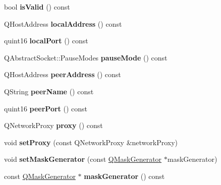\begin{DoxyCompactItemize}
bool {\bfseries is\+Valid} () const
\item 
\mbox{\label{class_q_web_socket_private_a81daf9f5f47d189e7106f7bd7df83405}} 
Q\+Host\+Address {\bfseries local\+Address} () const
\item 
\mbox{\label{class_q_web_socket_private_a9633bea87df6bb4908cb58a59bde0d8e}} 
quint16 {\bfseries local\+Port} () const
\item 
\mbox{\label{class_q_web_socket_private_aecddcb3dc07adda2f1967b769a670bac}} 
Q\+Abstract\+Socket\+::\+Pause\+Modes {\bfseries pause\+Mode} () const
\item 
\mbox{\label{class_q_web_socket_private_a9b6328d3cce77882a6bb64491b8585f1}} 
Q\+Host\+Address {\bfseries peer\+Address} () const
\item 
\mbox{\label{class_q_web_socket_private_a922403ed4819d606e890e794ad8cdc83}} 
Q\+String {\bfseries peer\+Name} () const
\item 
\mbox{\label{class_q_web_socket_private_afb3105d2a5bdb72f979471163a9bdb8f}} 
quint16 {\bfseries peer\+Port} () const
\item 
\mbox{\label{class_q_web_socket_private_a5a90aa93935d8d742536c437d6253677}} 
Q\+Network\+Proxy {\bfseries proxy} () const
\item 
\mbox{\label{class_q_web_socket_private_ac52ac72af846ed486839024c2600472f}} 
void {\bfseries set\+Proxy} (const Q\+Network\+Proxy \&network\+Proxy)
\item 
\mbox{\label{class_q_web_socket_private_a49a5b30b4f006cf111bff4e444d290f0}} 
void {\bfseries set\+Mask\+Generator} (const \mbox{\hyperlink{class_q_mask_generator}{Q\+Mask\+Generator}} $\ast$mask\+Generator)
\item 
\mbox{\label{class_q_web_socket_private_a1b585292c9f309e009fe4a1f34599bab}} 
const \mbox{\hyperlink{class_q_mask_generator}{Q\+Mask\+Generator}} $\ast$ {\bfseries mask\+Generator} () const

\end{DoxyCompactItemize}
